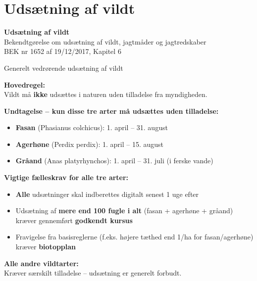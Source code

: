 \section{Udsætning af vildt}

\begin{frame}
  \vspace{3em}
  \begin{center}
    {\LARGE \textbf{Udsætning af vildt}
    }
    \\
    \vspace{1em}
    Bekendtgørelse om udsætning af vildt, jagtmåder og jagtredskaber
    \\
    \vspace{1em}
    BEK nr 1652 af 19/12/2017, Kapitel 6
  \end{center}
\end{frame}

\begin{frame}{Generelt vedrørende udsætning af vildt}

\textbf{Hovedregel:} \\
Vildt må \textbf{ikke} udsættes i naturen uden tilladelse fra myndigheden.

\textbf{Undtagelse – kun disse tre arter må udsættes uden tilladelse:}
\begin{itemize}
    \item \textbf{Fasan} (Phasianus colchicus): 1. april – 31. august
    \item \textbf{Agerhøne} (Perdix perdix): 1. april – 15. august
    \item \textbf{Gråand} (Anas platyrhynchos): 1. april – 31. juli (i ferske vande)
\end{itemize}

\textbf{Vigtige fælleskrav for alle tre arter:}
\begin{itemize}
    \item \textbf{Alle} udsætninger skal indberettes digitalt senest 1 uge efter
    \item Udsætning af \textbf{mere end 100 fugle i alt} (fasan + agerhøne + gråand) kræver gennemført \textbf{godkendt kursus}
    \item Fravigelse fra basisreglerne (f.eks. højere tæthed end 1/ha for fasan/agerhøne) kræver \textbf{biotopplan}
\end{itemize}

\textbf{Alle andre vildtarter:} \\
Kræver særskilt tilladelse – udsætning er generelt forbudt.

\end{frame}





